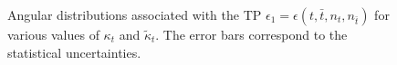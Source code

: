 \documentclass[aps,preprint,tightenlines,floatfix,superscriptaddress,nofootinbib,showpacs]{revtex4-1}
\def\tbar{\bar{t}}
\def\kp{\kappa_t}
\def\kpt{\tilde{\kappa}_t}
\begin{document}
\begin{center}
\begin{figure}[H]
\hspace*{-0.006\textwidth}
\vspace*{1cm}
\caption{Angular distributions associated with the TP
  $\epsilon_1 = \epsilon(t,\tbar,n_t,n_{\tbar})$ for various values of
  $\kp$ and $\kpt$. The error bars correspond to the statistical
  uncertainties.}
\label{fig5}
\end{figure}
\end{center}
\end{document}
